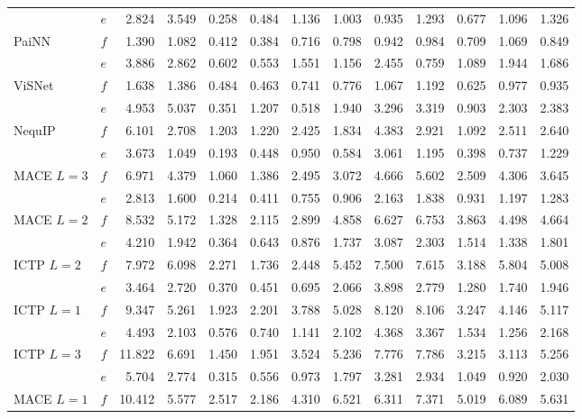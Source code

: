 \begin{table}[t]
\begin{tabular*}{\textwidth}{@{\extracolsep{\fill}}llrrrrrrrrrrr@{}}
 & $e$ & 2.824 & 3.549 & 0.258 & 0.484 & 1.136 & 1.003 & 0.935 & 1.293 & 0.677 & 1.096 & 1.326 \\
\addlinespace[1pt]
PaiNN & $f$ & 1.390 & 1.082 & 0.412 & 0.384 & 0.716 & 0.798 & 0.942 & 0.984 & 0.709 & 1.069 & 0.849 \\
 & $e$ & 3.886 & 2.862 & 0.602 & 0.553 & 1.551 & 1.156 & 2.455 & 0.759 & 1.089 & 1.944 & 1.686 \\
\addlinespace[1pt]
ViSNet & $f$ & 1.638 & 1.386 & 0.484 & 0.463 & 0.741 & 0.776 & 1.067 & 1.192 & 0.625 & 0.977 & 0.935 \\
 & $e$ & 4.953 & 5.037 & 0.351 & 1.207 & 0.518 & 1.940 & 3.296 & 3.319 & 0.903 & 2.303 & 2.383 \\
\addlinespace[1pt]
NequIP & $f$ & 6.101 & 2.708 & 1.203 & 1.220 & 2.425 & 1.834 & 4.383 & 2.921 & 1.092 & 2.511 & 2.640 \\
 & $e$ & 3.673 & 1.049 & 0.193 & 0.448 & 0.950 & 0.584 & 3.061 & 1.195 & 0.398 & 0.737 & 1.229 \\
\addlinespace[1pt]
MACE $L{=}3$ & $f$ & 6.971 & 4.379 & 1.060 & 1.386 & 2.495 & 3.072 & 4.666 & 5.602 & 2.509 & 4.306 & 3.645 \\
 & $e$ & 2.813 & 1.600 & 0.214 & 0.411 & 0.755 & 0.906 & 2.163 & 1.838 & 0.931 & 1.197 & 1.283 \\
\addlinespace[1pt]
MACE $L{=}2$ & $f$ & 8.532 & 5.172 & 1.328 & 2.115 & 2.899 & 4.858 & 6.627 & 6.753 & 3.863 & 4.498 & 4.664 \\
 & $e$ & 4.210 & 1.942 & 0.364 & 0.643 & 0.876 & 1.737 & 3.087 & 2.303 & 1.514 & 1.338 & 1.801 \\
\addlinespace[1pt]
ICTP $L{=}2$ & $f$ & 7.972 & 6.098 & 2.271 & 1.736 & 2.448 & 5.452 & 7.500 & 7.615 & 3.188 & 5.804 & 5.008 \\
 & $e$ & 3.464 & 2.720 & 0.370 & 0.451 & 0.695 & 2.066 & 3.898 & 2.779 & 1.280 & 1.740 & 1.946 \\
\addlinespace[1pt]
ICTP $L{=}1$ & $f$ & 9.347 & 5.261 & 1.923 & 2.201 & 3.788 & 5.028 & 8.120 & 8.106 & 3.247 & 4.146 & 5.117 \\
 & $e$ & 4.493 & 2.103 & 0.576 & 0.740 & 1.141 & 2.102 & 4.368 & 3.367 & 1.534 & 1.256 & 2.168 \\
\addlinespace[1pt]
ICTP $L{=}3$ & $f$ & 11.822 & 6.691 & 1.450 & 1.951 & 3.524 & 5.236 & 7.776 & 7.786 & 3.215 & 3.113 & 5.256 \\
 & $e$ & 5.704 & 2.774 & 0.315 & 0.556 & 0.973 & 1.797 & 3.281 & 2.934 & 1.049 & 0.920 & 2.030 \\
\addlinespace[1pt]
MACE $L{=}1$ & $f$ & 10.412 & 5.577 & 2.517 & 2.186 & 4.310 & 6.521 & 6.311 & 7.371 & 5.019 & 6.089 & 5.631 \\

\end{tabular*}
\end{table}
